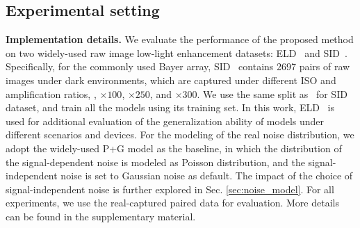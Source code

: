 \documentclass[10pt,twocolumn,letterpaper]{article}
\newcommand{\para}[1]{\noindent\textbf{#1}}
\begin{document}
\subsection{Experimental setting}
\para{Implementation details.}
We evaluate the performance of the proposed method on two widely-used raw image low-light enhancement datasets: ELD~\cite{wei2020physics} and SID~\cite{chen2018learning}. Specifically, for the commonly used Bayer array, SID~\cite{chen2018learning} contains 2697 pairs of raw images under dark environments, which are captured under different ISO and amplification ratios, \eg, $\times100$, $\times250$, and $\times300$. We use the same split as~\cite{wei2020physics} for SID~\cite{chen2018learning} dataset, and train all the models using its training set. In this work, ELD~\cite{wei2020physics} is used for additional evaluation of the generalization ability of models under different scenarios and devices.
For the modeling of the real noise distribution, we adopt the widely-used P+G model \cite{foi2008practical, wei2020physics} as the baseline, in which the distribution of the signal-dependent noise is modeled as Poisson distribution, and the signal-independent noise is set to Gaussian noise as default. 
The impact of the choice of signal-independent noise is further explored in Sec. 
\ref{sec:noise_model}. For all experiments, we use the real-captured paired data for evaluation. More details can be found in the supplementary material.
\end{document}
